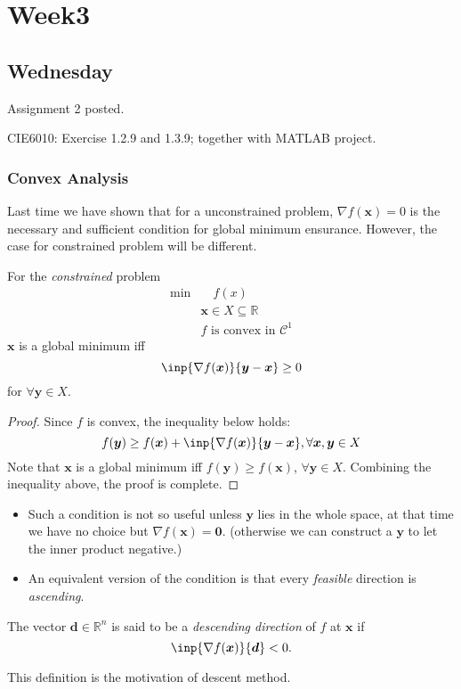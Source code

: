 
\chapter{Week3}

\section{Wednesday}
Assignment 2 posted.

CIE6010: Exercise 1.2.9 and 1.3.9; together with MATLAB project.

\subsection{Convex Analysis}
Last time we have shown that for a unconstrained problem, $\nabla f(\bm x)=0$ is the necessary and sufficient condition for global minimum ensurance. However, the case for constrained problem will be different.
\begin{proposition}
For the \emph{constrained} problem
\[
\begin{array}{ll}
\min&\quad f(x)\\
&\bm x\in X\subseteq\mathbb{R}\\
&f\mbox{ is convex in }\mathcal{C}^1
\end{array}
\]
$\bm x$ is a global minimum iff \[
\inp{\nabla f(\bm x)}{\bm y - \bm x}\ge0
\]
for $\forall\bm y\in X$.
\end{proposition}
\begin{proof}
Since $f$ is convex, the inequality below holds:
\[
f(\bm y)\ge f(\bm x)+\inp{\nabla f(\bm x)}{\bm y - \bm x},\forall \bm x,\bm y\in X
\]
Note that $\bm x$ is a global minimum iff $f(\bm y)\ge f(\bm x)$, $\forall \bm y\in X$. Combining the inequality above, the proof is complete.
\end{proof}
\begin{remark}
\begin{itemize}
\item
Such a condition is not so useful unless $\bm y$ lies in the whole space, at that time we have no choice but $\nabla f(\bm x)=\bm0$. (otherwise we can construct a $\bm y$ to let the inner product negative.)
\item
An equivalent version of the condition is that every \emph{feasible} direction is \emph{ascending}.
\end{itemize}
\end{remark}

\begin{definition}
The vector $\bm d\in\mathbb{R}^n$ is said to be a \emph{descending direction} of $f$ at $\bm x$ if
\[
\inp{\nabla f(\bm x)}{\bm d}<0.
\]
\end{definition}
This definition is the motivation of descent method.

